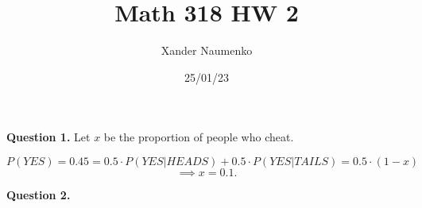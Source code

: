 \documentclass[letterpaper, reqno,11pt]{article}
\begin{document}
\title{Math 318 HW 2}
\date{25/01/23}
\author{Xander Naumenko}
\maketitle

{\medskip\noindent\bf Question 1.} Let $x$ be the proportion of people who cheat. 

\[
P(YES)=0.45=0.5\cdot P(YES|HEADS)+0.5\cdot P(YES|TAILS)=0.5\cdot (1-x)
\]
\[
\implies x=0.1
.\]

{\medskip\noindent\bf Question 2.} 
\end{document}
